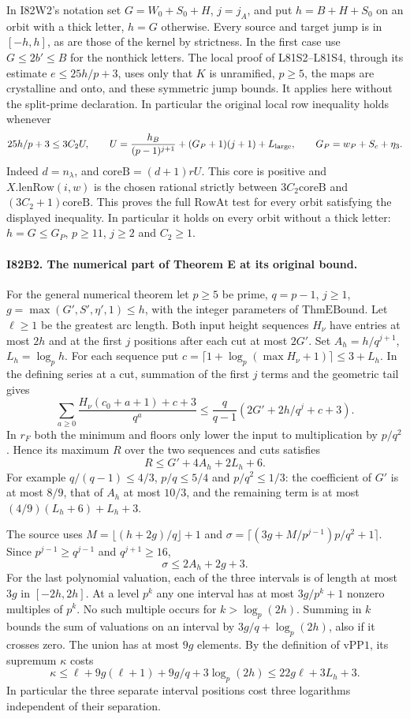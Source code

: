 In I82W2's notation set $G=W_0+S_0+H$, $j=j_A$, and put
$h=B+H+S_0$ on an orbit with a thick letter, $h=G$ otherwise.
Every source and target jump is in $[-h,h]$, as are those of the
kernel by strictness. In the first case use $G\le2b'\le B$ for
the nonthick letters. The local proof of L81S2--L81S4, through
its estimate $e\le25h/p+3$, uses only that $K$ is unramified,
$p\ge5$, the maps are crystalline and onto, and these symmetric
jump bounds. It applies here without the split-prime declaration.
In particular the original local row inequality holds whenever
\[
  25h/p+3\le 3C_2 U,\qquad
 U=\frac{h_B}{(p-1)^{j+1}}+(G_P+1)(j+1)+L_{\rm large},
 \qquad G_P=w_P+S_c+\eta_3 .
\]
Indeed $d=n_\lambda$, and $\mathrm{coreB}=(d+1)rU$.
This core is positive and $X.\mathrm{lenRow}(i,w)$ is the
chosen rational strictly between $3C_2\mathrm{coreB}$ and
$(3C_2+1)\mathrm{coreB}$. This proves the full $\mathrm{RowAt}$
test for every orbit satisfying the displayed inequality.
In particular it holds on every orbit without a thick letter:
$h=G\le G_P$, $p\ge11$, $j\ge2$ and $C_2\ge1$.

\paragraph{I82B2. The numerical part of Theorem E at its original bound.}
For the general numerical theorem let $p\ge5$ be prime, $q=p-1$,
$j\ge1$, $g=\max(G',S',\eta',1)\le h$, with the integer parameters
of $\mathrm{ThmEBound}$. Let $\ell\ge1$ be the greatest arc
length. Both input height sequences $H_\nu$ have entries at most
$2h$ and at the first $j$ positions after each cut at most $2G'$.
Set $A_h=h/q^{j+1}$, $L_h=\log_p h$. For each sequence put
$c=\lceil1+\log_p(\max H_\nu+1)\rceil\le3+L_h$.
In the defining series at a cut, summation of the first $j$
terms and the geometric tail gives
\[
 \sum_{a\ge0}\frac{H_\nu(c_0+a+1)+c+3}{q^a}
 \le\frac q{q-1}(2G'+2h/q^j+c+3).
\]
In $r_F$ both the minimum and floors only lower the input to
multiplication by $p/q^2$. Hence its maximum $R$ over the
two sequences and cuts satisfies
\[
 R\le G'+4A_h+2L_h+6.
\]
For example $q/(q-1)\le4/3$, $p/q\le5/4$ and $p/q^2\le1/3$:
the coefficient of $G'$ is at most $8/9$, that of $A_h$ at most
$10/3$, and the remaining term is at most $(4/9)(L_h+6)+L_h+3$.

The source uses $M=\lfloor(h+2g)/q\rfloor+1$ and
$\sigma=\lceil(3g+M/p^{j-1})p/q^2+1\rceil$.
Since $p^{j-1}\ge q^{j-1}$ and $q^{j+1}\ge16$,
\[
 \sigma\le 2A_h+2g+3 .
\]
For the last polynomial valuation, each of the three intervals
is of length at most $3g$ in $[-2h,2h]$. At a level $p^k$ any
one interval has at most $3g/p^k+1$ nonzero multiples of $p^k$.
No such multiple occurs for $k>\log_p(2h)$. Summing in $k$
bounds the sum of valuations on an interval by $3g/q+\log_p(2h)$,
also if it crosses zero. The union has at most $9g$ elements.
By the definition of $\mathrm{vPP1}$, its supremum $\kappa$ costs
\[
 \kappa\le\ell+9g(\ell+1)+9g/q+3\log_p(2h)
          \le22g\ell+3L_h+3 .
\]
In particular the three separate interval positions cost three
logarithms independent of their separation.

